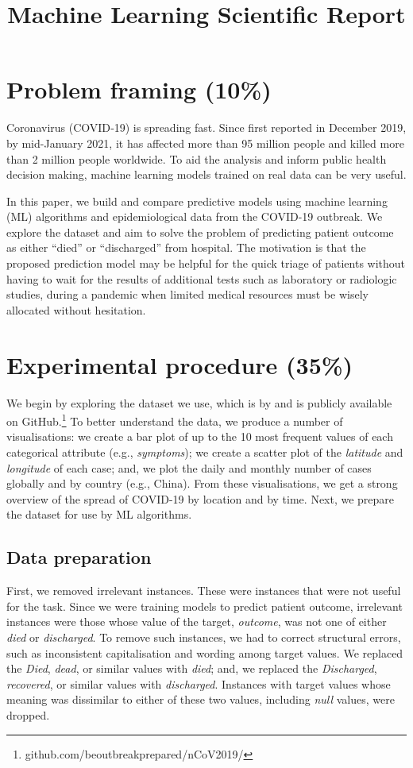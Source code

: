 \documentclass[twoside,11pt]{article}
\begin{document}
\title{Machine Learning Scientific Report}

\maketitle

\section{Problem framing (10\%)}
Coronavirus (COVID‑19) is spreading fast. Since first reported in December 2019, by mid-January 2021, it has affected more than 95 million people and killed more than 2 million people worldwide. To aid the analysis and inform public health decision making, machine learning models trained on real data can be very useful.

In this paper, we build and compare predictive models using machine learning (ML) algorithms and epidemiological data from the COVID-19 outbreak. We explore the dataset and aim to solve the problem of predicting patient outcome as either “died” or “discharged” from hospital. The motivation is that the proposed prediction model may be helpful for the quick triage of patients without having to wait for the results of additional tests such as laboratory or radiologic studies, during a pandemic when limited medical resources must be wisely allocated without hesitation. 

\section{Experimental procedure (35\%)}
We begin by exploring the dataset we use, which is by \cite{xu2020Epidemiological} and is publicly available on GitHub.\footnote{github.com/beoutbreakprepared/nCoV2019/} To better understand the data, we produce a number of visualisations: we create a bar plot of up to the 10 most frequent values of each categorical attribute (e.g., \emph{symptoms}); we create a scatter plot of the \emph{latitude} and \emph{longitude} of each case; and, we plot the daily and monthly number of cases globally and by country (e.g., China). From these visualisations, we get a strong overview of the spread of COVID-19 by location and by time. Next, we prepare the dataset for use by ML algorithms.

\subsection{Data preparation}
First, we removed irrelevant instances. These were instances that were not useful for the task. Since we were training models to predict patient outcome, irrelevant instances were those whose value of the target, \emph{outcome}, was not one of either \emph{died} or \emph{discharged}. To remove such instances, we had to correct structural errors, such as inconsistent capitalisation and wording among target values. We replaced the \emph{Died}, \emph{dead}, or similar values with \emph{died}; and, we replaced the \emph{Discharged}, \emph{recovered}, or similar values with \emph{discharged}. Instances with target values whose meaning was dissimilar to either of these two values, including \emph{null} values, were dropped.
\end{document}
